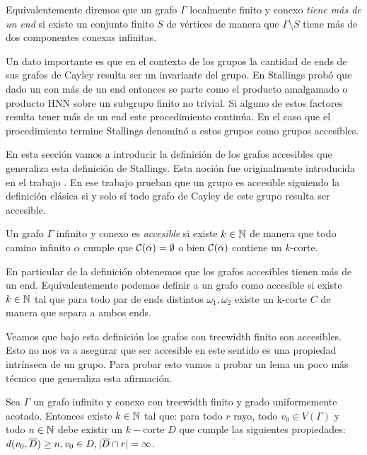 \documentclass[tesis.tex]{subfiles}
\begin{document}
Equivalentemente diremos que un grafo $\Gamma$ localmente finito y conexo \emph{tiene más de un end} si existe un conjunto finito $S$ de vértices de manera que $\Gamma \setminus S$ tiene más de dos componentes conexas infinitas.

Un dato importante es que en el contexto de los grupos la cantidad de ends de sus grafos de Cayley resulta ser un invariante del grupo.
En \cite{stallings1971group} Stallings probó que dado un \fg con más de un end entonces se parte como el producto amalgamado o producto HNN sobre un subgrupo finito no trivial.
Si alguno de estos factores resulta tener más de un end este procedimiento continúa.
En el caso que el procedimiento termine Stallings denominó a estos grupos como grupos accesibles. 

En esta sección vamos a introducir la definición de los grafos accesibles que generaliza esta definición de Stallings.
Esta noción fue originalmente introducida en el trabajo \cite{thomassen1993vertex}.
En ese trabajo prueban que un grupo es accesible siguiendo la definición clásica si y solo sí todo grafo de Cayley de este grupo resulta ser accesible.
\begin{deff}
	Un grafo $\Gamma$ infinito y conexo es \emph{accesible} si existe $k \in \mathbb{N}$ de manera que todo camino infinito $\alpha$ cumple que ${\cal C}(\alpha) = \emptyset$ o bien ${\cal C}(\alpha)$ contiene un $k$-corte.
\end{deff}
En particular de la definición obtenemos que los grafos accesibles tienen más de un end.
Equivalentemente podemos definir a un grafo como accesible si existe $k \in \mathbb{N}$ tal que para todo par de ends distintos $\omega_1, \omega_2$ existe un k-corte $C$ de manera que separa a ambos ends.


Veamos que bajo esta definición los grafos con treewidth finito son accesibles.
Esto no nos va a asegurar que ser accesible en este sentido es una propiedad intrínseca de un grupo.
Para probar esto vamos a probar un lema un poco más técnico que generaliza esta afirmación.

\begin{lema}\label{lema_corte_treewidth}
	Sea $\Gamma$ un grafo infinito y conexo con treewidth finito y grado uniformemente acotado.
	Entonces existe $k \in \mathbb{N}$ tal que:
	para todo $r$ rayo, todo $v_0 \in V(\Gamma)$ y todo $n \in \mathbb{N}$ debe existir un $k-$corte $D$ que cumple las siguientes propiedades: $d(v_0,\overline D) \ge n, v_0 \in D, |\overline D \cap r| = \infty$. 
\end{lema}
\end{document}
